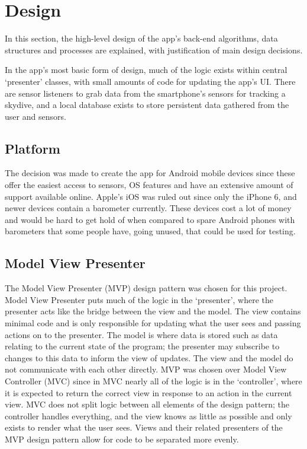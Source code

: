 \section{Design}\label{sec:design} %
In this section, the high-level design of the app's back-end algorithms, data structures and processes are explained, with justification of main design decisions.


In the app's most basic form of design, much of the logic exists within central `presenter' classes, with small amounts of code for updating the app's UI\@. There are sensor listeners to grab data from the smartphone's sensors for tracking a skydive, and a local database exists to store persistent data gathered from the user and sensors.

\subsection{Platform}
The decision was made to create the app for Android mobile devices since these offer the easiest access to sensors, OS features and have an extensive amount of support available online. Apple's iOS was ruled out since only the iPhone 6, and newer devices contain a barometer currently. These devices cost a lot of money and would be hard to get hold of when compared to spare Android phones with barometers that some people have, going unused, that could be used for testing.

\subsection{Model View Presenter}
The Model View Presenter (MVP) design pattern was chosen for this project. Model View Presenter puts much of the logic in the `presenter', where the presenter acts like the bridge between the view and the model. The view contains minimal code and is only responsible for updating what the user sees and passing actions on to the presenter. The model is where data is stored such as data relating to the current state of the program; the presenter may subscribe to changes to this data to inform the view of updates. The view and the model do not communicate with each other directly. MVP was chosen over Model View Controller (MVC) since in MVC nearly all of the logic is in the `controller', where it is expected to return the correct view in response to an action in the current view. MVC does not split logic between all elements of the design pattern; the controller handles everything, and the view knows as little as possible and only exists to render what the user sees. Views and their related presenters of the MVP design pattern allow for code to be separated more evenly.

